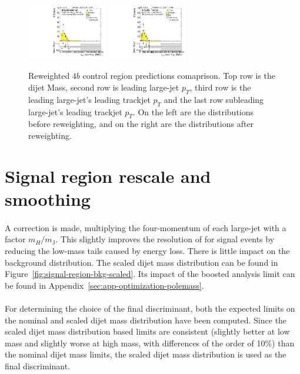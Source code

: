 \begin{figure}[htbp!]
\begin{center}
\includegraphics[width=0.31\textwidth,angle=-90]{figures/boosted/Prereweight/Moriond_FourTag_Control_sublHCand_trk0_Pt.pdf}
\includegraphics[width=0.31\textwidth,angle=-90]{figures/boosted/Control/b77_FourTag_Control_sublHCand_trk0_Pt.pdf}\\
\caption{Reweighted $4b$ control region predictions comaprison. Top row is the dijet Mass, second row is leading large-\R jet $p_{T}$, third row is the leading large-\R jet's leading trackjet $p_T$ and the last row subleading large-\R jet's leading trackjet $p_T$. On the left are the distributions before reweighting, and on the right are the distributions after reweighting.}
\label{fig:rw-4b-comp-cr}
\end{center}
\end{figure}



\clearpage
\section{Signal region rescale and smoothing}
\label{sec:boosted-SR-smoothing}

\paragraph{}
A correction is made, multiplying the four-momentum of each large-\R jet with a factor $m_{H}/m_{\mathrm{J}}$. 
This slightly improves the resolution of \mtwoJ for signal events by reducing the low-mass tails caused by energy loss. 
There is little impact on the background distribution.
The scaled dijet mass distribution can be found in Figure~\ref{fig:signal-region-bkg-scaled}.
Its impact of the boosted analysis limit can be found in Appendix~\ref{sec:app-optimization-polemass}.

\paragraph{}
For determining the choice of the final discriminant, both the expected limits on the nominal and scaled dijet mass distribution have been computed.  
Since the scaled dijet mass distribution based limits are consistent (slightly better at low mass and slightly worse at high mass, with differences of the order of 10\%) than the nominal dijet mass limits, the scaled dijet mass distribution is used as the final discriminant.

